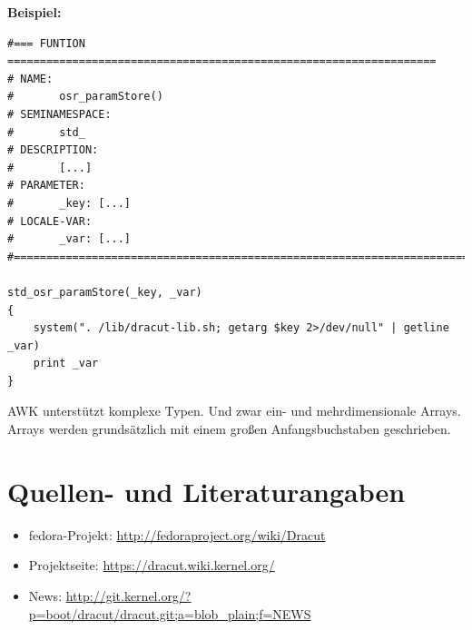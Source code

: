 \documentclass[10pt,a4paper]{article}
\begin{document}
\bigskip 
\textbf{Beispiel:}


\begin{verbatim}
#=== FUNTION ==================================================================
# NAME:
#       osr_paramStore()
# SEMINAMESPACE:
#       std_
# DESCRIPTION:
#       [...]
# PARAMETER:
#       _key: [...]
# LOCALE-VAR:
#       _var: [...]
#==============================================================================

std_osr_paramStore(_key, _var)
{
    system(". /lib/dracut-lib.sh; getarg $key 2>/dev/null" | getline _var)
    print _var
}
\end{verbatim}


AWK unterstützt komplexe Typen. Und zwar ein- und mehrdimensionale Arrays. Arrays werden grundsätzlich mit einem großen Anfangsbuchstaben geschrieben. 




\section{Quellen- und Literaturangaben}
\label{sec:quell}

\begin{itemize}
 \item fedora-Projekt: \url{http://fedoraproject.org/wiki/Dracut}
 \item Projektseite: \url{https://dracut.wiki.kernel.org/}
 \item News: \url{http://git.kernel.org/?p=boot/dracut/dracut.git;a=blob_plain;f=NEWS}
\end{itemize}
\end{document}

